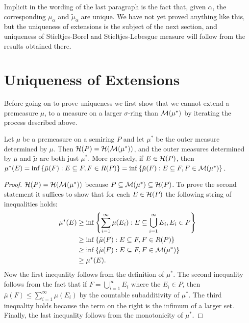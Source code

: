 Implicit in the wording of the last paragraph is the fact that, given $\alpha$, the corresponding $\bar{\mu}_\alpha$ and $\tilde{\mu}_\alpha$ are unique. We have not yet proved anything like this, but the uniqueness of extensions is the subject of the next section, and uniqueness of Stieltjes-Borel and Stieltjes-Lebesgue measure will follow from the results obtained there.

\section{Uniqueness of Extensions}

Before going on to prove uniqueness we first show that we cannot extend a premeasure $\mu$, to a measure on a larger $\sigma$-ring than ${\cal M}(\mu^*)$ by iterating the process described above.

\begin{proposition}
Let $\mu$ be a premeasure on a semiring $P$ and let $\mu^*$ be the outer measure determined by $\mu$. Then ${\cal H}(P)={\cal H}({\cal M}(\mu^*))$, and the outer measures determined by $\bar{\mu}$ and $\tilde{\mu}$ are both just $\mu^*$. More precisely, if $E \in {\cal H}(P)$, then $\mu^*(E)=\inf \left\{\bar{\mu}(F): E \subseteq F, F \in R(P)\right\}=\inf \left\{\tilde{\mu}(F): E \subseteq F, F \in {\cal M}(\mu^*)\right\}$.
\end{proposition}

\begin{proof}

${\cal H}(P)={\cal H}({\cal M}(\mu^*))$ because $P \subseteq {\cal M}(\mu^*) \subseteq {\cal H}(P)$. To prove the second statement it suffices to show that for each $E \in {\cal H}(P)$ the following string of inequalities holds:
\begin{align*}
    \mu^*(E) &\geq \inf\left\{\sum_{i=1}^\infty\mu(E_i): E \subseteq \bigcup_{i=1}^\infty E_i, E_i \in P\right\}\\
    &\geq \inf \left\{\bar{\mu}(F): E \subseteq F, F \in R(P)\right\}\\
    &\geq \inf \left\{\tilde{\mu}(F): E \subseteq F, {F} \in {\cal M}(\mu^*)\right\}\\
    &\geq \mu^*(E).
\end{align*}
Now the first inequality follows from the definition of $\mu^*$. The second inequality follows from the fact that if $F=\bigcup_{i=1}^\infty E_i$ where the $E_i \in P$, then $\bar{\mu}(F) \leq \sum_{i=1}^\infty \mu\left(E_i\right)$ by the countable subadditivity of $\mu^*$. The third inequality holds because the term on the right is the infimum of a larger set. Finally, the last inequality follows from the monotonicity of $\mu^*$.
\end{proof}

